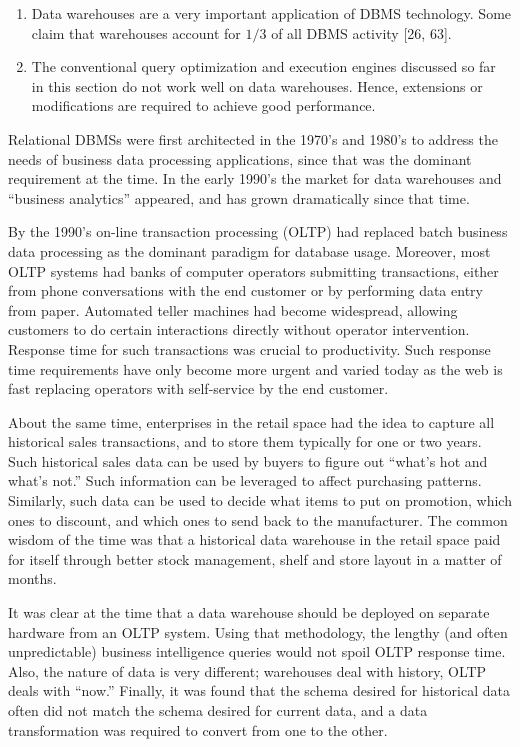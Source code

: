 \documentclass[b5paper,11pt,twoside,openright]{book}
\begin{document}
\begin{enumerate}
\def\labelenumi{\arabic{enumi}.}
\item
  Data warehouses are a very important application of DBMS technology.
  Some claim that warehouses account for $1/3$ of all DBMS activity {[}26,
  63{]}.
\item
  The conventional query optimization and execution engines discussed so
  far in this section do not work well on data warehouses. Hence,
  extensions or modifications are required to achieve good performance.
\end{enumerate}

Relational DBMSs were first architected in the 1970's and 1980's to
address the needs of business data processing applications, since that
was the dominant requirement at the time. In the early 1990's the market
for data warehouses and ``business analytics'' appeared, and has grown
dramatically since that time.

By the 1990's on-line transaction processing (OLTP) had replaced batch
business data processing as the dominant paradigm for database usage.
Moreover, most OLTP systems had banks of computer operators submitting
transactions, either from phone conversations with the end customer or
by performing data entry from paper. Automated teller machines had
become widespread, allowing customers to do certain interactions
directly without operator intervention. Response time for such
transactions was crucial to productivity. Such response time
requirements have only become more urgent and varied today as the web is
fast replacing operators with self-service by the end customer.

About the same time, enterprises in the retail space had the idea to
capture all historical sales transactions, and to store them typically
for one or two years. Such historical sales data can be used by buyers
to figure out ``what's hot and what's not.'' Such information can be
leveraged to affect purchasing patterns. Similarly, such data can be
used to decide what items to put on promotion, which ones to discount,
and which ones to send back to the manufacturer. The common wisdom of
the time was that a historical data warehouse in the retail space paid
for itself through better stock management, shelf and store layout in a
matter of months.

It was clear at the time that a data warehouse should be deployed on
separate hardware from an OLTP system. Using that methodology, the
lengthy (and often unpredictable) business intelligence queries would
not spoil OLTP response time. Also, the nature of data is very
different; warehouses deal with history, OLTP deals with ``now.''
Finally, it was found that the schema desired for historical data often
did not match the schema desired for current data, and a data
transformation was required to convert from one to the other.
\end{document}
